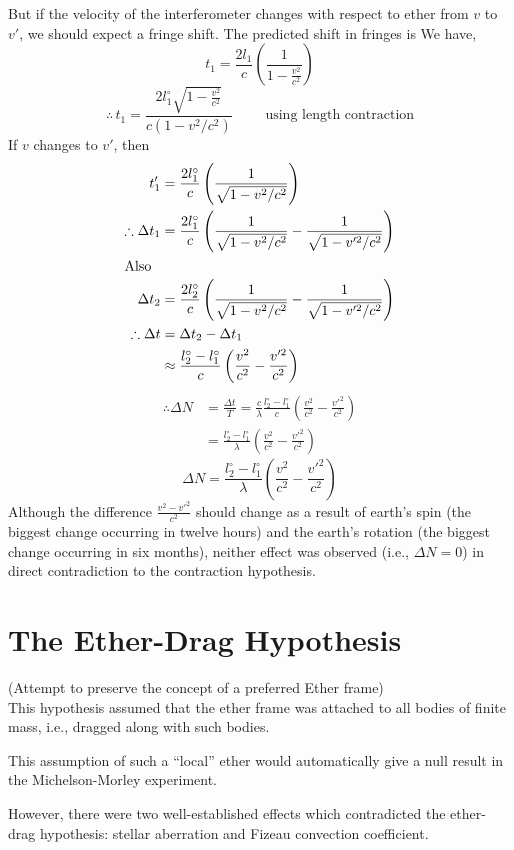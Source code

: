 \documentclass[../main-sheet.tex]{subfiles}
\begin{document}
But if the velocity of the interferometer changes with respect to ether from \(v \) to \(v'\), we should expect a fringe shift. The predicted shift in fringes is
We have,
\[t_1=\frac{2l_1}{c }\left( \frac{1}{1-\frac{v^2}{c^2}} \right)\]
\[\therefore\,t_1=\frac{2l_1^\circ \sqrt{1-\frac{v^2}{c^2 }}}{c(1-v^2/c^2)}\qquad\text{ using length contraction}\]
If \(v \) changes to \(v'\), then
\begin{align*}
    t_1'&=\frac{2l_1^\circ }{c }\left( \frac{1}{\sqrt{1-v^2/c^2}} \right)\\
    \therefore \Delta t_1&=\frac{2l_1^\circ }{c }\left( \frac{1}{\sqrt{1-v^2/c^2}}-\frac{1}{\sqrt{1-v'^2/c^2}} \right)\\
    \intertext{Also}
    \Delta t_2&=\frac{2l_2^\circ }{c }\left( \frac{1}{\sqrt{1-v^2/c^2}}-\frac{1}{\sqrt{1-v'^2/c^2}} \right)\\
    \therefore \Delta t&=\Delta t_2-\Delta t_1\\
    &\approx \frac{l_2^\circ-l_1^\circ }{c }\left( \frac{v^2 }{c^2}-\frac{v'^2}{c^2} \right)
\end{align*}
\begin{align*}
    \therefore \Delta N&=\frac{\Delta t }{T }=\frac{c }{\lambda}\frac{l_2^\circ -l_1^\circ }{c}\left( \frac{v^2 }{c^2}-\frac{v'^2}{c^2} \right)\\
    &=\frac{l_2^\circ-l_1^\circ }{\lambda}\left( \frac{v^2}{c^2 }-\frac{v'^2}{c^2} \right) 
\end{align*}
\[\Delta N=\frac{l_2^\circ-l_1^\circ }{\lambda}\left( \frac{v^2}{c^2 }-\frac{v'^2}{c^2} \right) \]
Although the difference \(\frac{v^2-v'^2}{c^2}\) should change as a result of earth's spin (the biggest change occurring in twelve hours) and the earth's rotation (the biggest change occurring in six months), neither effect was observed (i.e., \(\Delta N=0\)) in direct contradiction to the contraction hypothesis.
\section{The Ether-Drag Hypothesis }
\footnotesize{(Attempt to preserve the concept of a preferred Ether frame)}\\
\normalsize
This hypothesis assumed that the ether frame was attached to all bodies of finite mass, i.e., dragged along with such bodies.

This assumption of such a ``local'' ether would automatically give a null result in the Michelson-Morley experiment.

However, there were two well-established effects which contradicted the ether-drag hypothesis: stellar aberration and Fizeau convection coefficient.
\end{document}
